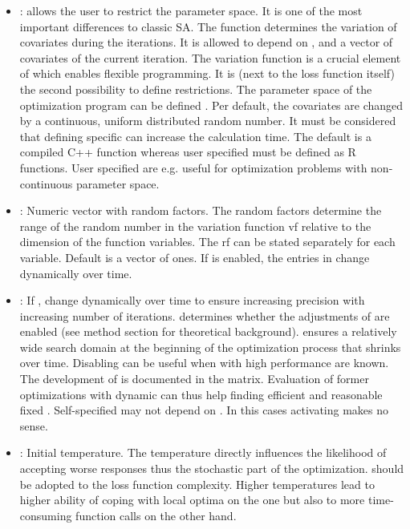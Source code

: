 \begin{itemize}
	\item {}:   allows the user to restrict the parameter space. It is one of the most important differences to classic SA. The function determines the variation of covariates during the iterations. It is allowed to depend on ,  and a vector of covariates of the current iteration. The variation function is a crucial element of  which enables flexible programming. It is (next to the loss function itself) the second possibility to define restrictions. The parameter space of the optimization program can be defined . Per default, the covariates are changed by a continuous, uniform distributed random number. It must be considered that defining specific  can increase the calculation time. The default  is a compiled C++ function whereas user specified  must be defined as R functions. User specified are e.g. useful for optimization problems with non-continuous parameter space.
	\item {}: Numeric vector with random factors. The random factors determine the range of the random number in the variation function vf relative to the dimension of the function variables. The rf can be stated separately for each variable. Default is a vector of ones. If  is enabled, the entries in  change dynamically over time.
	\item {}: If ,  change dynamically over time to ensure increasing precision with increasing number of iterations.  determines whether the adjustments of \citet{corana_1987, pronzato_1984} are enabled (see method section for theoretical background).  ensures a relatively wide search domain at the beginning of the optimization process that shrinks over time. Disabling  can be useful when  with high performance are known. The development of  is documented in the  matrix. Evaluation of former optimizations with dynamic  can thus help finding efficient and reasonable fixed . Self-specified  may not depend on . In this cases activating  makes no sense.
	\item {}: Initial temperature. The temperature directly influences the likelihood of accepting worse responses thus the stochastic part of the optimization.  should be adopted to the loss function complexity. Higher temperatures lead to higher ability of coping with local optima on the one but also to more time-consuming function calls on the other hand.

\end{itemize}
